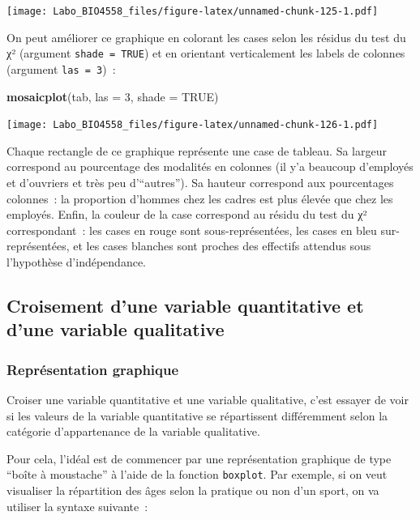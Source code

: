 \documentclass[12pt,]{book}
\newenvironment{Shaded}{\begin{snugshade}}{\end{snugshade}}
\newcommand{\DataTypeTok}[1]{\textcolor[rgb]{0.27,0.27,0.27}{#1}}
\newcommand{\DecValTok}[1]{\textcolor[rgb]{0.06,0.06,0.06}{#1}}
\newcommand{\KeywordTok}[1]{\textcolor[rgb]{0.27,0.27,0.27}{\textbf{#1}}}
\newcommand{\NormalTok}[1]{#1}
\newcommand{\OtherTok}[1]{\textcolor[rgb]{0.37,0.37,0.37}{#1}}
\begin{document}
\texttt{[image: Labo\_BIO4558\_files/figure-latex/unnamed-chunk-125-1.pdf]}

On peut améliorer ce graphique en colorant les cases selon les résidus du test du χ² (argument \texttt{shade\ =\ TRUE}) et en orientant verticalement les labels de colonnes (argument \texttt{las\ =\ 3})~:

\begin{Shaded}
\begin{Highlighting}[]
\KeywordTok{mosaicplot}\NormalTok{(tab, }\DataTypeTok{las =} \DecValTok{3}\NormalTok{, }\DataTypeTok{shade =} \OtherTok{TRUE}\NormalTok{)}
\end{Highlighting}
\end{Shaded}

\texttt{[image: Labo\_BIO4558\_files/figure-latex/unnamed-chunk-126-1.pdf]}

Chaque rectangle de ce graphique représente une case de tableau. Sa largeur correspond au pourcentage des modalités en colonnes (il y'a beaucoup d'employés et d'ouvriers et très peu d'``autres''). Sa hauteur correspond aux pourcentages colonnes~: la proportion d'hommes chez les cadres est plus élevée que chez les employés. Enfin, la couleur de la case correspond au résidu du test du χ² correspondant~: les cases en rouge sont sous-représentées, les cases en bleu sur-représentées, et les cases blanches sont proches des effectifs attendus sous l'hypothèse d'indépendance.

\hypertarget{croisement-dune-variable-quantitative-et-dune-variable-qualitative}{%
\subsection{Croisement d'une variable quantitative et d'une variable qualitative}\label{croisement-dune-variable-quantitative-et-dune-variable-qualitative}}

\hypertarget{repruxe9sentation-graphique-1}{%
\subsubsection{Représentation graphique}\label{repruxe9sentation-graphique-1}}

Croiser une variable quantitative et une variable qualitative, c'est essayer de voir si les valeurs de la variable quantitative se répartissent différemment selon la catégorie d'appartenance de la variable qualitative.

Pour cela, l'idéal est de commencer par une représentation graphique de type ``boîte à moustache'' à l'aide de la fonction \texttt{boxplot}. Par exemple, si on veut visualiser la répartition des âges selon la pratique ou non d'un sport, on va utiliser la syntaxe suivante~:
\end{document}
